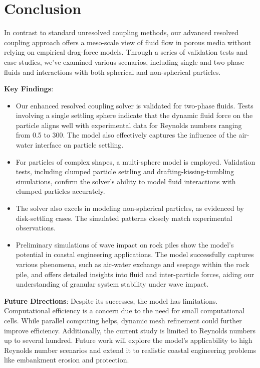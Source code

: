 
\chapter{Conclusion}\label{chap:ipsum}

In contrast to standard unresolved coupling methods, our advanced resolved coupling approach offers a meso-scale view of fluid flow in porous media without relying on empirical drag-force models. Through a series of validation tests and case studies, we've examined various scenarios, including single and two-phase fluids and interactions with both spherical and non-spherical particles.

\textbf{Key Findings}:
\begin{itemize}
    \item Our enhanced resolved coupling solver is validated for two-phase fluids. Tests involving a single settling sphere indicate that the dynamic fluid force on the particle aligns well with experimental data for Reynolds numbers ranging from 0.5 to 300. The model also effectively captures the influence of the air-water interface on particle settling.
\item For particles of complex shapes, a multi-sphere model is employed. Validation tests, including clumped particle settling and drafting-kissing-tumbling simulations, confirm the solver's ability to model fluid interactions with clumped particles accurately.
\item The solver also excels in modeling non-spherical particles, as evidenced by disk-settling cases. The simulated patterns closely match experimental observations.
\item Preliminary simulations of wave impact on rock piles show the model's potential in coastal engineering applications. The model successfully captures various phenomena, such as air-water exchange and seepage within the rock pile, and offers detailed insights into fluid and inter-particle forces, aiding our understanding of granular system stability under wave impact.
\end{itemize}

\textbf{Future Directions}:
Despite its successes, the model has limitations. Computational efficiency is a concern due to the need for small computational cells. While parallel computing helps, dynamic mesh refinement could further improve efficiency. Additionally, the current study is limited to Reynolds numbers up to several hundred. Future work will explore the model's applicability to high Reynolds number scenarios and extend it to realistic coastal engineering problems like embankment erosion and protection.

